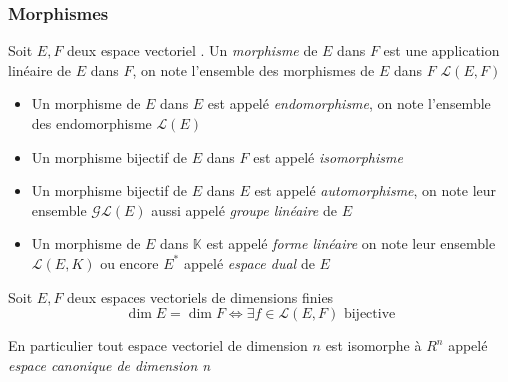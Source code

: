 \documentclass[11pt,colorlinks]{book}
\theoremstyle{mytheoremstyle}
\theoremstyle{mytheoremstyle}
\theoremstyle{mytheoremstyle}
\theoremstyle{mytheoremstyle}
\theoremstyle{mytheoremstyle}
\theoremstyle{mytheoremstyle}
\theoremstyle{mytheoremstyle}
\theoremstyle{mytheoremstyle}
\theoremstyle{myproblemstyle}
\def\mbb#1{\mathbb{#1}}
\def\mfc#1{\mathcal{#1}}
\def\bK{\mbb{K}}
\def\ev{espace vectoriel }
\def\mor{\mfc{L}(E,F)}
\def\endo{\mfc{L}(E)}
\begin{document}
\subsubsection{Morphismes}
\begin{definition}
  Soit $E,F$ deux \ev. Un \textit{morphisme} de $E$ dans $F$ est une application linéaire de $E$ dans $F$, on note 
  l'ensemble des morphismes de $E$ dans $F$ $\mor$
\end{definition}
\begin{definition}
  \begin{itemize}
    \item Un morphisme de $E$ dans $E$ est appelé \textit{endomorphisme}, on note l'ensemble des endomorphisme $\endo$
    \item Un morphisme bijectif de $E$ dans $F$ est appelé \textit{isomorphisme}
    \item Un morphisme bijectif de $E$ dans $E$ est appelé \textit{automorphisme}, on note leur ensemble $\mfc{GL}(E)$ aussi 
    appelé \textit{groupe linéaire} de $E$
    \item Un morphisme de $E$ dans $\bK$ est appelé \textit{forme linéaire} on note leur ensemble $\mfc{L}(E,K)$ ou encore $E^*$ appelé 
    \textit{espace dual} de $E$
  \end{itemize}
\end{definition}
\begin{theorem}
  Soit $E,F$ deux espaces vectoriels de dimensions finies
  \begin{equation*}
    \dim E = \dim F \Leftrightarrow \exists f \in \mfc{L}(E,F) \text{ bijective}
  \end{equation*}
\end{theorem}
\begin{rmq}
  En particulier tout \ev de dimension $n$ est isomorphe à $R^n$ appelé \textit{espace canonique de dimension n}
\end{rmq}
\end{document}
